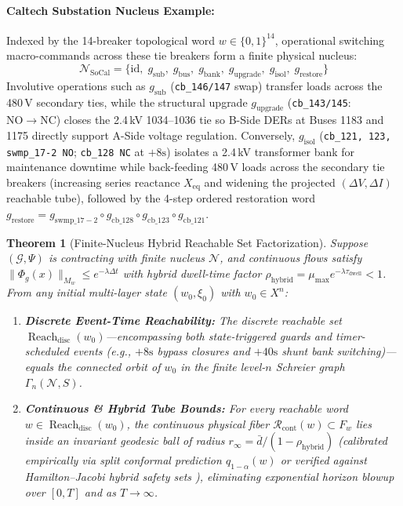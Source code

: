 \documentclass[11pt]{article}
\newtheorem{theorem}{Theorem}
\begin{document}
\paragraph{Caltech Substation Nucleus Example:}
Indexed by the 14-breaker topological word $w \in \{0, 1\}^{14}$, operational switching macro-commands across these tie breakers form a finite physical nucleus:
\begin{equation}
\mathcal{N}_{\mathrm{SoCal}} = \big\{ \mathrm{id},\; g_{\mathrm{sub}},\; g_{\mathrm{bus}},\; g_{\mathrm{bank}},\; g_{\mathrm{upgrade}},\; g_{\mathrm{isol}},\; g_{\mathrm{restore}} \big\}
\end{equation}
Involutive operations such as $g_{\mathrm{sub}}$ (\texttt{cb\_146/147} swap) transfer loads across the 480\,V secondary ties, while the structural upgrade $g_{\mathrm{upgrade}}$ (\texttt{cb\_143/145}: $\mathrm{NO} \to \mathrm{NC}$) closes the 2.4\,kV 1034--1036 tie so B-Side DERs at Buses 1183 and 1175 directly support A-Side voltage regulation. Conversely, $g_{\mathrm{isol}}$ (\texttt{cb\_121, 123, swmp\_17-2 NO}; \texttt{cb\_128 NC} at $+8\text{s}$) isolates a 2.4\,kV transformer bank for maintenance downtime while back-feeding 480\,V loads across the secondary tie breakers (increasing series reactance $X_{\mathrm{eq}}$ and widening the projected $(\Delta V, \Delta I)$ reachable tube), followed by the 4-step ordered restoration word $g_{\mathrm{restore}} = g_{\mathrm{swmp\_17-2}} \circ g_{\mathrm{cb\_128}} \circ g_{\mathrm{cb\_123}} \circ g_{\mathrm{cb\_121}}$.

\begin{theorem}[Finite-Nucleus Hybrid Reachable Set Factorization]
Suppose $(\mathcal{G}, \Psi)$ is contracting with finite nucleus $\mathcal{N}$, and continuous flows satisfy $\|\Phi_g(x)\|_{M_w} \le e^{-\lambda \Delta t}$ with hybrid dwell-time factor $\rho_{\mathrm{hybrid}} = \mu_{\max} e^{-\lambda \tau_{\mathrm{dwell}}} < 1$. From any initial multi-layer state $(w_0, \xi_0)$ with $w_0 \in X^n$:
\begin{enumerate}
    \item \textbf{Discrete Event-Time Reachability:} The discrete reachable set $\operatorname{Reach}_{\mathrm{disc}}(w_0)$---encompassing both state-triggered guards and timer-scheduled events (e.g., $+8\text{s}$ bypass closures and $+40\text{s}$ shunt bank switching)---equals the connected orbit of $w_0$ in the finite level-$n$ Schreier graph $\Gamma_n(\mathcal{N}, S)$.
    \item \textbf{Continuous \& Hybrid Tube Bounds:} For every reachable word $w \in \operatorname{Reach}_{\mathrm{disc}}(w_0)$, the continuous physical fiber $\mathcal{R}_{\mathrm{cont}}(w) \subset F_w$ lies inside an invariant geodesic ball of radius $r_\infty = \bar{d}/(1 - \rho_{\mathrm{hybrid}})$ (calibrated empirically via split conformal prediction $q_{1-\alpha}(w)$ \cite{Vovk2005} or verified against Hamilton--Jacobi hybrid safety sets \cite{Borquez2026}), eliminating exponential horizon blowup over $[0, T]$ and as $T \to \infty$.
\end{enumerate}
\end{theorem}
\end{document}
